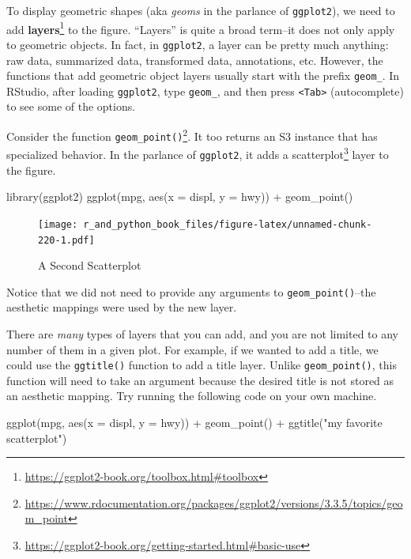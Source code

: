 \documentclass[
  12pt,
  krantz2]{krantz}
\makeatletter
\newenvironment{Shaded}{\begin{snugshade}}{\end{snugshade}}
\newcommand{\AttributeTok}[1]{\textcolor[rgb]{0.61,0.61,0.61}{#1}}
\newcommand{\FunctionTok}[1]{\textcolor[rgb]{0,0,0}{#1}}
\newcommand{\NormalTok}[1]{#1}
\newcommand{\SpecialCharTok}[1]{\textcolor[rgb]{0,0,0}{#1}}
\newcommand{\StringTok}[1]{\textcolor[rgb]{0.5,0.5,0.5}{#1}}
\renewcommand{\href}[2]{#2\footnote{\url{#1}}}
\newenvironment{kframe}{%
\medskip{}
\setlength{\fboxsep}{.8em}
 \def\at@end@of@kframe{}%
 \ifinner\ifhmode%
  \def\at@end@of@kframe{\end{minipage}}%
  \begin{minipage}{\columnwidth}%
 \fi\fi%
 \def\FrameCommand##1{\hskip\@totalleftmargin \hskip-\fboxsep
 \colorbox{shadecolor}{##1}\hskip-\fboxsep
     \hskip-\linewidth \hskip-\@totalleftmargin \hskip\columnwidth}%
 \MakeFramed {\advance\hsize-\width
   \@totalleftmargin\z@ \linewidth\hsize
   \@setminipage}}%
 {\par\unskip\endMakeFramed%
 \at@end@of@kframe}
\renewenvironment{Shaded}{\begin{kframe}}{\end{kframe}}
\makeatother
\begin{document}
To display geometric shapes (aka \emph{geoms} in the parlance of \texttt{ggplot2}), we need to add \href{https://ggplot2-book.org/toolbox.html\#toolbox}{\textbf{layers}} to the figure. ``Layers'' is quite a broad term--it does not only apply to geometric objects. In fact, in \texttt{ggplot2}, a layer can be pretty much anything: raw data, summarized data, transformed data, annotations, etc. However, the functions that add geometric object layers usually start with the prefix \texttt{geom\_}. In RStudio, after loading \texttt{ggplot2}, type \texttt{geom\_}, and then press \texttt{\textless{}Tab\textgreater{}} (autocomplete) to see some of the options.

Consider the function \href{https://www.rdocumentation.org/packages/ggplot2/versions/3.3.5/topics/geom_point}{\texttt{geom\_point()}}. It too returns an S3 instance that has specialized behavior. In the parlance of \texttt{ggplot2}, it adds a \href{https://ggplot2-book.org/getting-started.html\#basic-use}{scatterplot} layer to the figure.

\begin{Shaded}
\begin{Highlighting}[]
\FunctionTok{library}\NormalTok{(ggplot2)}
\FunctionTok{ggplot}\NormalTok{(mpg, }\FunctionTok{aes}\NormalTok{(}\AttributeTok{x =}\NormalTok{ displ, }\AttributeTok{y =}\NormalTok{ hwy))  }\SpecialCharTok{+}
  \FunctionTok{geom\_point}\NormalTok{()}
\end{Highlighting}
\end{Shaded}

\begin{figure}
\centering
\texttt{[image: r\_and\_python\_book\_files/figure-latex/unnamed-chunk-220-1.pdf]}
\caption{\label{fig:unnamed-chunk-220}A Second Scatterplot}
\end{figure}

Notice that we did not need to provide any arguments to \texttt{geom\_point()}--the aesthetic mappings were used by the new layer.

There are \emph{many} types of layers that you can add, and you are not limited to any number of them in a given plot. For example, if we wanted to add a title, we could use the \texttt{ggtitle()} function to add a title layer. Unlike \texttt{geom\_point()}, this function will need to take an argument because the desired title is not stored as an aesthetic mapping. Try running the following code on your own machine.

\begin{Shaded}
\begin{Highlighting}[]
\FunctionTok{ggplot}\NormalTok{(mpg, }\FunctionTok{aes}\NormalTok{(}\AttributeTok{x =}\NormalTok{ displ, }\AttributeTok{y =}\NormalTok{ hwy))  }\SpecialCharTok{+}
  \FunctionTok{geom\_point}\NormalTok{() }\SpecialCharTok{+} 
  \FunctionTok{ggtitle}\NormalTok{(}\StringTok{"my favorite scatterplot"}\NormalTok{)}
\end{Highlighting}
\end{Shaded}
\end{document}
